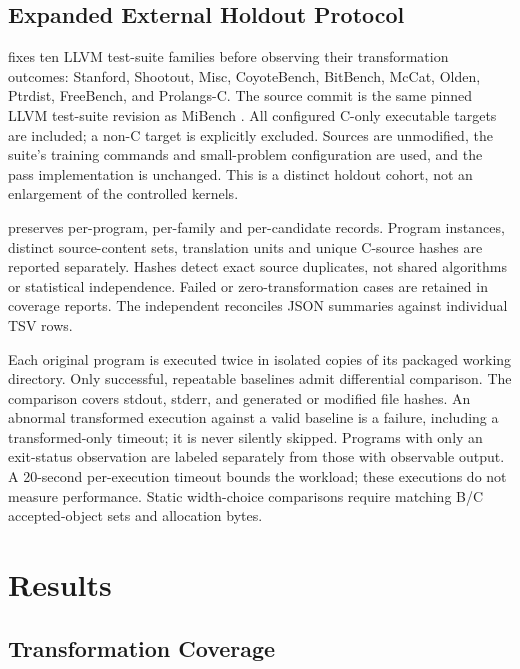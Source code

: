 \documentclass[11pt,twocolumn]{article}
\begin{document}
\subsection{Expanded External Holdout Protocol}

 fixes ten LLVM test-suite families before
observing their transformation outcomes: Stanford, Shootout, Misc, CoyoteBench,
BitBench, McCat, Olden, Ptrdist, FreeBench, and Prolangs-C. The source commit is
the same pinned LLVM test-suite revision as MiBench \citep{llvmTestSuite}.
All configured C-only executable targets are included; a non-C target is
explicitly excluded. Sources are unmodified, the suite's training commands and
small-problem configuration are used, and the pass implementation is unchanged.
This is a distinct holdout cohort, not an enlargement of the controlled kernels.

 preserves per-program, per-family
and per-candidate records. Program instances, distinct source-content sets,
translation units and unique C-source hashes are reported separately. Hashes
detect exact source duplicates, not shared algorithms or statistical
independence. Failed or zero-transformation cases are retained in coverage
reports. The independent  reconciles
JSON summaries against individual TSV rows.

Each original program is executed twice in isolated copies of its packaged
working directory. Only successful, repeatable baselines admit differential
comparison. The comparison covers stdout, stderr, and generated or modified
file hashes. An abnormal transformed execution against a valid baseline is a
failure, including a transformed-only timeout; it is never silently skipped.
Programs with only an exit-status observation are labeled separately from
those with observable output. A 20-second per-execution timeout bounds the
workload; these executions do not measure performance. Static width-choice
comparisons require matching B/C accepted-object sets and allocation bytes.

\section{Results}

\subsection{Transformation Coverage}
\end{document}
